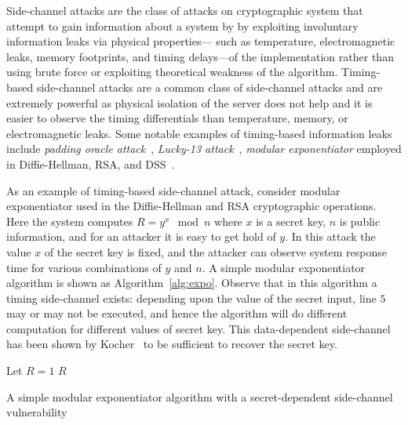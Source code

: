 Side-channel attacks are the class of attacks on cryptographic system that
attempt to gain information about a system by by exploiting involuntary
information leaks via physical properties---
such as temperature, electromagnetic leaks, memory footprints, and timing
delays---of the implementation rather than using brute force or exploiting
theoretical weakness of the algorithm.
Timing-based side-channel attacks are a common class of
side-channel attacks and are extremely powerful as physical isolation of the
server does not help and it is easier to observe the timing differentials than
temperature, memory, or electromagnetic leaks.  
Some notable examples of timing-based information leaks include \emph{padding oracle
attack}~\cite{Vau02}, \emph{Lucky-13 attack}~\cite{al2013lucky},  \emph{modular
exponentiator} employed in Diffie-Hellman, RSA, and DSS~\cite{kocher96}.

As an example of timing-based side-channel attack, consider modular
exponentiator used in the Diffie-Hellman and RSA cryptographic operations.
Here the system computes $R = y^x \mod n$ where $x$ is a secret key, $n$ is
public information, and for an attacker it is easy to get hold of $y$.
In this attack the value $x$ of the secret key is fixed, and the attacker can
observe system response time for various combinations of $y$ and $n$.
A simple modular exponentiator algorithm is shown as Algorithm~\ref{alg:expo}.
Observe that in this algorithm a timing side-channel exists: depending upon
the value of the secret input, line $5$ may or may not be executed, and hence
the algorithm will do different computation for different values of secret key.
This data-dependent side-channel has been shown by Kocher~\cite{kocher96} to be sufficient to recover the secret key.
\begin{algorithm}[t]
Let $R = 1$\;
\Return $R$\;
\caption{A simple modular exponentiator algorithm with a secret-dependent side-channel vulnerability}
\label{alg:expo}
\end{algorithm}

